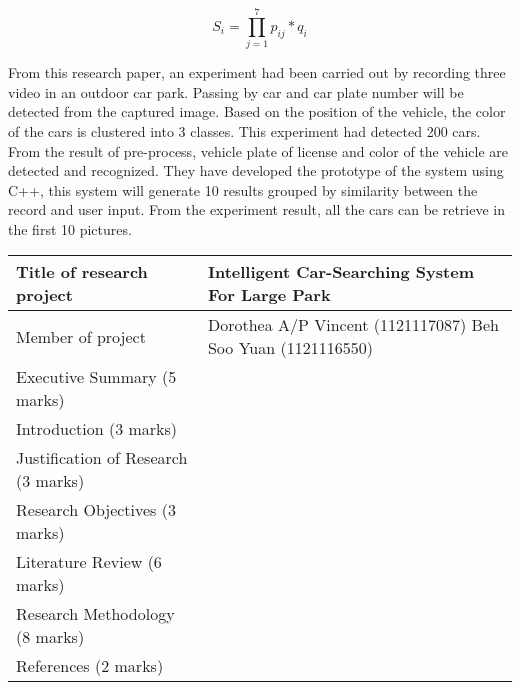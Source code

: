 \documentclass[12pt]{article}
\begin{document}
\begin{equation}
S_i =\prod_{j=1}^7 p_{ij} * q_i 
\end{equation}

From this research paper, an experiment had been carried out by recording three video in an outdoor car park. Passing by car and car plate number will be detected from the captured image. Based on the position of the vehicle, the color of the cars is clustered into 3 classes. This experiment had detected 200 cars. From the result of pre-process, vehicle plate of license and color of the vehicle are detected and recognized. They have developed the prototype of the system using C++, this system will generate 10 results grouped by similarity between the record and user input. From the experiment result, all the cars can be retrieve in the first 10 pictures.



\pagebreak




\begin{tabular}{|m{6cm} |m{10cm}|}
\hline 
Title of research project & Intelligent Car-Searching System For Large Park\\ 
\hline
Member of project & Dorothea A/P Vincent (1121117087) \newline Beh Soo Yuan (1121116550) \\ 
\hline 
Executive Summary (5 marks) & \\ 
\hline 
Introduction (3 marks) & \\ 
\hline 
Justification of Research (3
marks) & \\ 
\hline 
Research Objectives (3 marks) & \\ 
\hline 
Literature Review (6 marks) & \\ 
\hline 
Research Methodology (8 marks) & \\ 
\hline 
References (2 marks) & \\
\hline 
\end{tabular} 
\end{document}
